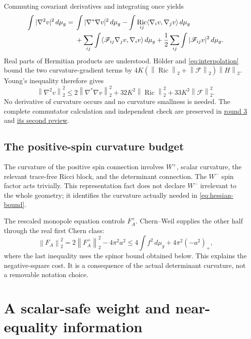 \documentclass[11pt,a4paper]{article}
\theoremstyle{definition}
\theoremstyle{remark}
\DeclareMathOperator{\Ric}{Ric}
\newcommand{\dd}{\,d\mu_g}
\newcommand{\norm}[1]{\left\|#1\right\|}
\newcommand{\roundref}[2]{\href{run:../references/rounds/#1}{#2}}
\numberwithin{equation}{section}
\begin{document}
Commuting covariant derivatives and integrating once yields
\begin{align}
 \int|\nabla^2v|^2\dd={}&\int|\nabla^*\nabla v|^2\dd
   -\int\Ric_{ij}\langle\nabla_iv,\nabla_jv\rangle\dd\notag\\
 &+\sum_{ij}\int\langle\mathscr F_{ij}\nabla_jv,\nabla_iv\rangle\dd
   +\frac12\sum_{ij}\int|\mathscr F_{ij}v|^2\dd.
                                                        \label{eq:hessian-identity}
\end{align}
Real parts of Hermitian products are understood. H\"older and
\eqref{eq:interpolation} bound the two curvature-gradient terms by
$4K(\norm{\Ric}_2+\norm{\mathscr F}_2)\norm H_2$.
Young's inequality therefore gives
\begin{equation}\label{eq:hessian-bound}
 \norm{\nabla^2v}_2^2\le2\norm{\nabla^*\nabla v}_2^2
             +32K^2\norm{\Ric}_2^2+33K^2\norm{\mathscr F}_2^2.
\end{equation}
No derivative of curvature occurs and no curvature smallness is needed.
The complete commutator calculation and independent check are preserved
in \roundref{round3_rigidity.md}{round 3} and
\roundref{round3_rigidity_second_review.md}{its second review}.

\subsection{The positive-spin curvature budget}\label{sub:spin-curvature}
The curvature of the positive spin connection involves $W^+$, scalar
curvature, the relevant trace-free Ricci block, and the determinant
connection. The $W^-$ spin factor acts trivially. This representation
fact does not declare $W^-$ irrelevant to the whole geometry; it identifies
the curvature actually needed in \eqref{eq:hessian-bound}.

The rescaled monopole equation controls $F_A^+$. Chern--Weil supplies
the other half through the real first Chern class:
\begin{equation}\label{eq:determinant-budget}
 \norm{F_A}_2^2=2\norm{F_A^+}_2^2-4\pi^2a^2
             \le4\int f^2\dd+4\pi^2(-a^2)_+,
\end{equation}
where the last inequality uses the spinor bound obtained below.
This explains the negative-square cost. It is a consequence of the
actual determinant curvature, not a removable notation choice.

\section{A scalar-safe weight and near-equality information}\label{sec:weight}
\end{document}
